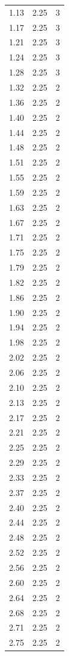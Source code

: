 \begin{longtable}{lrr}
  1.13 & 2.25 & 3 \\
  1.17 & 2.25 & 3 \\
  1.21 & 2.25 & 3 \\
  1.24 & 2.25 & 3 \\
  1.28 & 2.25 & 3 \\
  1.32 & 2.25 & 2 \\
  1.36 & 2.25 & 2 \\
  1.40 & 2.25 & 2 \\
  1.44 & 2.25 & 2 \\
  1.48 & 2.25 & 2 \\
  1.51 & 2.25 & 2 \\
  1.55 & 2.25 & 2 \\
  1.59 & 2.25 & 2 \\
  1.63 & 2.25 & 2 \\
  1.67 & 2.25 & 2 \\
  1.71 & 2.25 & 2 \\
  1.75 & 2.25 & 2 \\
  1.79 & 2.25 & 2 \\
  1.82 & 2.25 & 2 \\
  1.86 & 2.25 & 2 \\
  1.90 & 2.25 & 2 \\
  1.94 & 2.25 & 2 \\
  1.98 & 2.25 & 2 \\
  2.02 & 2.25 & 2 \\
  2.06 & 2.25 & 2 \\
  2.10 & 2.25 & 2 \\
  2.13 & 2.25 & 2 \\
  2.17 & 2.25 & 2 \\
  2.21 & 2.25 & 2 \\
  2.25 & 2.25 & 2 \\
  2.29 & 2.25 & 2 \\
  2.33 & 2.25 & 2 \\
  2.37 & 2.25 & 2 \\
  2.40 & 2.25 & 2 \\
  2.44 & 2.25 & 2 \\
  2.48 & 2.25 & 2 \\
  2.52 & 2.25 & 2 \\
  2.56 & 2.25 & 2 \\
  2.60 & 2.25 & 2 \\
  2.64 & 2.25 & 2 \\
  2.68 & 2.25 & 2 \\
  2.71 & 2.25 & 2 \\
  2.75 & 2.25 & 2 \\

\end{longtable}
